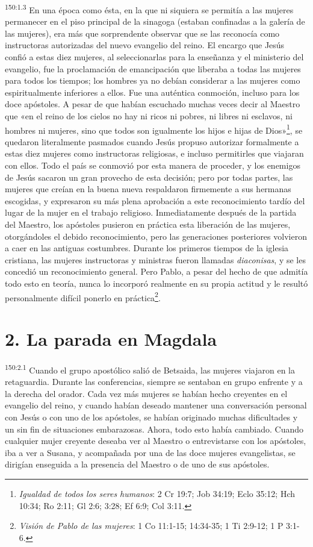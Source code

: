 \par 
\textsuperscript{150:1.3} En una época como ésta, en la que ni siquiera se permitía a las mujeres permanecer en el piso principal de la sinagoga (estaban confinadas a la galería de las mujeres), era más que sorprendente observar que se las reconocía como instructoras autorizadas del nuevo evangelio del reino. El encargo que Jesús confió a estas diez mujeres, al seleccionarlas para la enseñanza y el ministerio del evangelio, fue la proclamación de emancipación que liberaba a todas las mujeres para todos los tiempos; los hombres ya no debían considerar a las mujeres como espiritualmente inferiores a ellos. Fue una auténtica conmoción, incluso para los doce apóstoles. A pesar de que habían escuchado muchas veces decir al Maestro que «en el reino de los cielos no hay ni ricos ni pobres, ni libres ni esclavos, ni hombres ni mujeres, sino que todos son igualmente los hijos e hijas de Dios»\footnote{\textit{Igualdad de todos los seres humanos}: 2 Cr 19:7; Job 34:19; Eclo 35:12; Hch 10:34; Ro 2:11; Gl 2:6; 3:28; Ef 6:9; Col 3:11.}, se quedaron literalmente pasmados cuando Jesús propuso autorizar formalmente a estas diez mujeres como instructoras religiosas, e incluso permitirles que viajaran con ellos. Todo el país se conmovió por esta manera de proceder, y los enemigos de Jesús sacaron un gran provecho de esta decisión; pero por todas partes, las mujeres que creían en la buena nueva respaldaron firmemente a sus hermanas escogidas, y expresaron su más plena aprobación a este reconocimiento tardío del lugar de la mujer en el trabajo religioso. Inmediatamente después de la partida del Maestro, los apóstoles pusieron en práctica esta liberación de las mujeres, otorgándoles el debido reconocimiento, pero las generaciones posteriores volvieron a caer en las antiguas costumbres. Durante los primeros tiempos de la iglesia cristiana, las mujeres instructoras y ministras fueron llamadas \textit{diaconisas}, y se les concedió un reconocimiento general. Pero Pablo, a pesar del hecho de que admitía todo esto en teoría, nunca lo incorporó realmente en su propia actitud y le resultó personalmente difícil ponerlo en práctica\footnote{\textit{Visión de Pablo de las mujeres}: 1 Co 11:1-15; 14:34-35; 1 Ti 2:9-12; 1 P 3:1-6.}.

\section*{2. La parada en Magdala}
\par 
\textsuperscript{150:2.1} Cuando el grupo apostólico salió de Betsaida, las mujeres viajaron en la retaguardia. Durante las conferencias, siempre se sentaban en grupo enfrente y a la derecha del orador. Cada vez más mujeres se habían hecho creyentes en el evangelio del reino, y cuando habían deseado mantener una conversación personal con Jesús o con uno de los apóstoles, se habían originado muchas dificultades y un sin fin de situaciones embarazosas. Ahora, todo esto había cambiado. Cuando cualquier mujer creyente deseaba ver al Maestro o entrevistarse con los apóstoles, iba a ver a Susana, y acompañada por una de las doce mujeres evangelistas, se dirigían enseguida a la presencia del Maestro o de uno de sus apóstoles.

